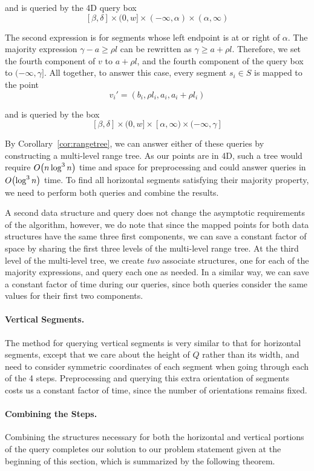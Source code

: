 \noindent and is queried by the 4D query box
\[
[\beta, \delta] \times (0, w] \times (-\infty, \alpha) \times (\alpha, \infty)
\]

The second expression is for segments whose left endpoint is at or right of $\alpha$. The majority expression $\gamma - a \geq \rho l$ can be rewritten as $\gamma \geq a + \rho l$. 
Therefore, we set the fourth component of $v$ to $a + \rho l$, and the fourth component of the query box to $(-\infty, \gamma]$.  
All together, to answer this case, every segment $s_i \in S$ is mapped to the point
\[
v_i' = (b_i, \rho l_i, a_i, a_i + \rho l_i)
\]

\noindent and is queried by the box
\[
[\beta, \delta] \times (0, w] \times [\alpha, \infty) \times (-\infty, \gamma]
\]

By Corollary~\ref{cor:rangetree}, we can answer either of these queries by constructing a multi-level range tree.
As our points are in 4D, such a tree would require $O\!\left(n \log^3{n}\right)$ time and space for preprocessing and could answer queries in $O\!\left(\log^3{n}\right)$ time.
To find all horizontal segments satisfying their majority property, we need to perform both queries and combine the results.  

A second data structure and query does not change the asymptotic requirements of the algorithm, however, we do note that since the mapped points for both data structures have the same three first components, we can save a constant factor of space by sharing the first three levels of the multi-level range tree. 
At the third level of the multi-level tree, we create \emph{two} associate structures, one for each of the majority expressions, and query each one as needed. 
In a similar way, we can save a constant factor of time during our queries, since both queries consider the same values for their first two components.


\paragraph{Vertical Segments.} The method for querying vertical segments is very similar to that for horizontal segments, except that we care about the height of $Q$ rather than its width, and need to consider symmetric coordinates of each segment when going through each of the 4 steps.
Preprocessing and querying this extra orientation of segments costs us a constant factor of time, since the number of orientations remains fixed.


\paragraph{Combining the Steps.} Combining the structures necessary for both the horizontal and vertical portions of the query completes our solution to our problem statement given at the beginning of this section, which is summarized by the following theorem.


